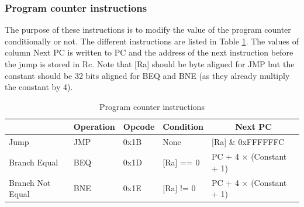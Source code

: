 \subsubsection*{Program counter instructions}

The purpose of these instructions is to modify the value of the program counter conditionally or 
not. The different instructions are listed in Table \ref{tab:instruction/pc}. The values of 
column Next PC is written to PC and the address of the next instruction before the jump is
stored in Rc. Note that [Ra] should be byte aligned for JMP but the constant should be 32 bits 
aligned for BEQ and BNE (as they already multiply the constant by 4).

\begin{table}[H]
    \centering
    \begin{tabular}{|l|l|l|l|l|}
    \hline
    \rowcolor[HTML]{DAE8FC} 
    \multicolumn{1}{|c|}{\cellcolor[HTML]{DAE8FC}\textbf{Name}} & \multicolumn{1}{c|}{\cellcolor[HTML]{DAE8FC}\textbf{Operation}} & \multicolumn{1}{c|}{\cellcolor[HTML]{DAE8FC}\textbf{Opcode}} & \multicolumn{1}{c|}{\cellcolor[HTML]{DAE8FC}\textbf{Condition}} & \multicolumn{1}{c|}{\cellcolor[HTML]{DAE8FC}\textbf{Next PC}} \\ \hline
    Jump                                                        & JMP                                                             & 0x1B                                                         & None                                                                 & {[}Ra{]} \& 0xFFFFFFC                                         \\ \hline
    Branch Equal                                                & BEQ                                                             & 0x1D                                                         & {[}Ra{]} == 0                                                        & PC + 4 $\times$ (Constant + 1)             \\ \hline
    Branch Not Equal                                            & BNE                                                             & 0x1E                                                         & {[}Ra{]} != 0                                                        & PC + 4 $\times$ (Constant + 1)                \\ \hline
    \end{tabular}
    \caption{Program counter instructions}
    \label{tab:instruction/pc}
\end{table}

